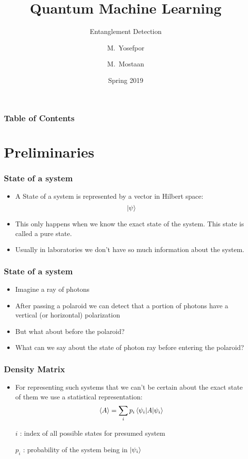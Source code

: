 \documentclass[11pt]{beamer}
\title[Entanglement Detection]{Quantum Machine Learning}
\subtitle{Entanglement Detection}
\author[Yosefpor,Mostaan]
{M.~Yosefpor \and M.~Mostaan}
\institute[SUT]{Sharif University of Technology}
\date[Spring 2019]{Spring 2019}
\begin{document}
 
\frame{\titlepage}

\begin{frame}
\frametitle{Table of Contents}
\tableofcontents
\end{frame}

\section{Preliminaries}
\begin{frame}
\frametitle{State of a system}

\begin{itemize}
 \item  A State of a system is represented by a vector in Hilbert space:
 $$\ket{\psi}$$
 \item  This only happens when we know the exact state of the system. This state is called a pure state.
 \item  Usually in laboratories we don’t have so much information about the system.
\end{itemize}
\end{frame}
\begin{frame}
\frametitle{State of a system}


\begin{itemize}
 \item  Imagine a ray of photons
 \item  After passing a polaroid we can detect that a portion of photons have a vertical (or horizontal) polarization
 \item  But what about before the polaroid?
 \item  What can we say about the state of photon ray before entering the polaroid?
\end{itemize}

\end{frame}
\begin{frame}
\frametitle{Density Matrix}

\begin{itemize}
 \item  For representing such systems that we can’t be certain about the exact state of them we use a statistical representation: $$ \braket{A} = \sum_i p_i \braket{\psi_i | A | \psi_i}$$


$i$ : index of all possible states for presumed system

$p_i$  : probability of the system being in $\ket{\psi_i}$

\end{itemize}

\end{frame}
\end{document}
